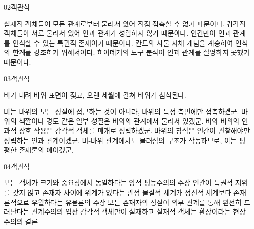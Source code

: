 \documentclass[fs85,seriesWit]{korfarm-base}
\begin{document}
\begin{kfQBlock}{02}{객관식}
\begin{kfChoices}
\kfChoice 실재적 객체들이 모든 관계로부터 물러서 있어 직접 접촉할 수 없기 때문이다.
\kfChoice 감각적 객체들이 서로 물러서 있어 인과 관계가 성립하지 않기 때문이다.
\kfChoice 인간만이 인과 관계를 인식할 수 있는 특권적 존재이기 때문이다.
\kfChoice 칸트의 사물 자체 개념을 계승하여 인식의 한계를 강조하기 위해서이다.
\kfChoice 하이데거의 도구 분석이 인과 관계를 설명하지 못했기 때문이다.
\end{kfChoices}
\end{kfQBlock}

\begin{kfQBlock}{03}{객관식}
\begin{kfEvidence}비가 내려 바위 표면이 젖고, 오랜 세월에 걸쳐 바위가 침식된다.\end{kfEvidence}
\begin{kfChoices}
\kfChoice 비는 바위의 모든 성질에 접근하는 것이 아니라, 바위의 특정 측면에만 접촉하겠군.
\kfChoice 바위의 색깔이나 경도 같은 일부 성질은 비와의 관계에서 물러서 있겠군.
\kfChoice 비와 바위의 인과적 상호 작용은 감각적 객체를 매개로 성립하겠군.
\kfChoice 바위의 침식은 인간이 관찰해야만 성립하는 인과 관계이겠군.
\kfChoice 비-바위 관계에서도 물러섬의 구조가 작동하므로, 이는 평평한 존재론의 예이겠군.
\end{kfChoices}
\end{kfQBlock}

\begin{kfQBlock}{04}{객관식}
\begin{kfChoices}
\kfChoice 모든 객체가 크기와 중요성에서 동일하다는 양적 평등주의의 주장
\kfChoice 인간이 특권적 지위를 갖지 않고 존재자 사이에 위계가 없다는 관점
\kfChoice 물질적 세계가 정신적 세계보다 존재론적으로 우월하다는 유물론의 주장
\kfChoice 모든 존재자의 성질이 외부 관계를 통해 완전히 드러난다는 관계주의의 입장
\kfChoice 감각적 객체만이 실재하고 실재적 객체는 환상이라는 현상주의의 결론
\end{kfChoices}
\end{kfQBlock}

\kfEndMC
\end{document}
